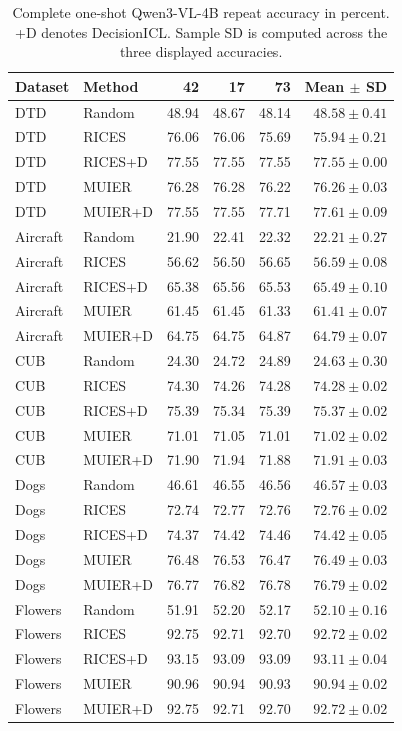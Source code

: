 \documentclass[10pt,twocolumn,letterpaper]{article}
\newcommand{\method}{DecisionICL\xspace}
\begin{document}
\begin{table}[t]
\caption{Complete one-shot Qwen3-VL-4B repeat accuracy in percent. +D denotes \method. Sample SD is computed across the three displayed accuracies.}
\label{sup:repeat_accuracy_1}
\centering\small
\begin{tabular}{llrrrr}
\toprule
Dataset & Method & 42 & 17 & 73 & Mean $\pm$ SD \\
\midrule
DTD & Random & 48.94 & 48.67 & 48.14 & $48.58 \pm 0.41$ \\
DTD & RICES & 76.06 & 76.06 & 75.69 & $75.94 \pm 0.21$ \\
DTD & RICES+D & 77.55 & 77.55 & 77.55 & $77.55 \pm 0.00$ \\
DTD & MUIER & 76.28 & 76.28 & 76.22 & $76.26 \pm 0.03$ \\
DTD & MUIER+D & 77.55 & 77.55 & 77.71 & $77.61 \pm 0.09$ \\
Aircraft & Random & 21.90 & 22.41 & 22.32 & $22.21 \pm 0.27$ \\
Aircraft & RICES & 56.62 & 56.50 & 56.65 & $56.59 \pm 0.08$ \\
Aircraft & RICES+D & 65.38 & 65.56 & 65.53 & $65.49 \pm 0.10$ \\
Aircraft & MUIER & 61.45 & 61.45 & 61.33 & $61.41 \pm 0.07$ \\
Aircraft & MUIER+D & 64.75 & 64.75 & 64.87 & $64.79 \pm 0.07$ \\
CUB & Random & 24.30 & 24.72 & 24.89 & $24.63 \pm 0.30$ \\
CUB & RICES & 74.30 & 74.26 & 74.28 & $74.28 \pm 0.02$ \\
CUB & RICES+D & 75.39 & 75.34 & 75.39 & $75.37 \pm 0.02$ \\
CUB & MUIER & 71.01 & 71.05 & 71.01 & $71.02 \pm 0.02$ \\
CUB & MUIER+D & 71.90 & 71.94 & 71.88 & $71.91 \pm 0.03$ \\
Dogs & Random & 46.61 & 46.55 & 46.56 & $46.57 \pm 0.03$ \\
Dogs & RICES & 72.74 & 72.77 & 72.76 & $72.76 \pm 0.02$ \\
Dogs & RICES+D & 74.37 & 74.42 & 74.46 & $74.42 \pm 0.05$ \\
Dogs & MUIER & 76.48 & 76.53 & 76.47 & $76.49 \pm 0.03$ \\
Dogs & MUIER+D & 76.77 & 76.82 & 76.78 & $76.79 \pm 0.02$ \\
Flowers & Random & 51.91 & 52.20 & 52.17 & $52.10 \pm 0.16$ \\
Flowers & RICES & 92.75 & 92.71 & 92.70 & $92.72 \pm 0.02$ \\
Flowers & RICES+D & 93.15 & 93.09 & 93.09 & $93.11 \pm 0.04$ \\
Flowers & MUIER & 90.96 & 90.94 & 90.93 & $90.94 \pm 0.02$ \\
Flowers & MUIER+D & 92.75 & 92.71 & 92.70 & $92.72 \pm 0.02$ \\
\bottomrule
\end{tabular}
\end{table}
\end{document}

